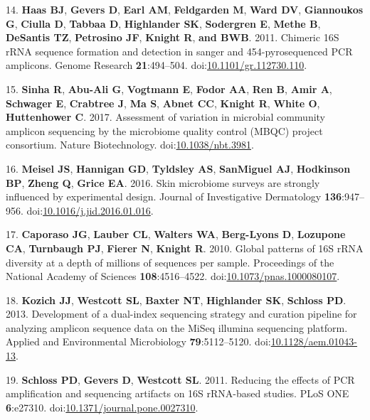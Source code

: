 \documentclass[11,]{article}
\begin{document}
14. \textbf{Haas BJ}, \textbf{Gevers D}, \textbf{Earl AM},
\textbf{Feldgarden M}, \textbf{Ward DV}, \textbf{Giannoukos G},
\textbf{Ciulla D}, \textbf{Tabbaa D}, \textbf{Highlander SK},
\textbf{Sodergren E}, \textbf{Methe B}, \textbf{DeSantis TZ},
\textbf{Petrosino JF}, \textbf{Knight R}, \textbf{and BWB}. 2011.
Chimeric 16S rRNA sequence formation and detection in sanger and
454-pyrosequenced PCR amplicons. Genome Research \textbf{21}:494--504.
doi:\href{http://dx.doi.org/10.1101/gr.112730.110}{10.1101/gr.112730.110}.

15. \textbf{Sinha R}, \textbf{Abu-Ali G}, \textbf{Vogtmann E},
\textbf{Fodor AA}, \textbf{Ren B}, \textbf{Amir A}, \textbf{Schwager E},
\textbf{Crabtree J}, \textbf{Ma S}, \textbf{Abnet CC}, \textbf{Knight
R}, \textbf{White O}, \textbf{Huttenhower C}. 2017. Assessment of
variation in microbial community amplicon sequencing by the microbiome
quality control (MBQC) project consortium. Nature Biotechnology.
doi:\href{http://dx.doi.org/10.1038/nbt.3981}{10.1038/nbt.3981}.

16. \textbf{Meisel JS}, \textbf{Hannigan GD}, \textbf{Tyldsley AS},
\textbf{SanMiguel AJ}, \textbf{Hodkinson BP}, \textbf{Zheng Q},
\textbf{Grice EA}. 2016. Skin microbiome surveys are strongly influenced
by experimental design. Journal of Investigative Dermatology
\textbf{136}:947--956.
doi:\href{http://dx.doi.org/10.1016/j.jid.2016.01.016}{10.1016/j.jid.2016.01.016}.

17. \textbf{Caporaso JG}, \textbf{Lauber CL}, \textbf{Walters WA},
\textbf{Berg-Lyons D}, \textbf{Lozupone CA}, \textbf{Turnbaugh PJ},
\textbf{Fierer N}, \textbf{Knight R}. 2010. Global patterns of 16S rRNA
diversity at a depth of millions of sequences per sample. Proceedings of
the National Academy of Sciences \textbf{108}:4516--4522.
doi:\href{http://dx.doi.org/10.1073/pnas.1000080107}{10.1073/pnas.1000080107}.

18. \textbf{Kozich JJ}, \textbf{Westcott SL}, \textbf{Baxter NT},
\textbf{Highlander SK}, \textbf{Schloss PD}. 2013. Development of a
dual-index sequencing strategy and curation pipeline for analyzing
amplicon sequence data on the MiSeq illumina sequencing platform.
Applied and Environmental Microbiology \textbf{79}:5112--5120.
doi:\href{http://dx.doi.org/10.1128/aem.01043-13}{10.1128/aem.01043-13}.

19. \textbf{Schloss PD}, \textbf{Gevers D}, \textbf{Westcott SL}. 2011.
Reducing the effects of PCR amplification and sequencing artifacts on
16S rRNA-based studies. PLoS ONE \textbf{6}:e27310.
doi:\href{http://dx.doi.org/10.1371/journal.pone.0027310}{10.1371/journal.pone.0027310}.
\end{document}
